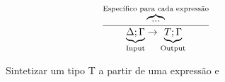 \begin{figure}[h!]
  \begin{gather*}
    \frac{\overbrace{\text{...}}^{\text{Específico para cada expressão}}}
    {\underbrace{\Delta;\Gamma}_{\text{Input}} \rightarrow
      \underbrace{T;\Gamma}_{\text{Output}}}
  \end{gather*}
  \caption{Sintetizar um tipo T a partir de uma expressão e}
  \label{fig:synthesize}
\end{figure}



